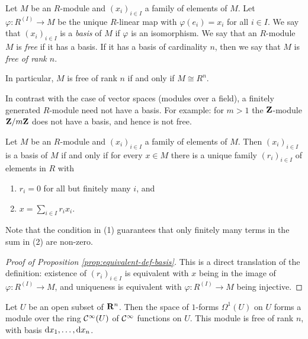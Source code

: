 \begin{definition}
Let $M$ be an $R$-module and $(x_i)_{i \in I}$ a family of elements of $M$. Let $\varphi\colon R^{(I)} \to M$ be the unique $R$-linear map with
$\varphi(e_i)=x_i$ for all $i\in I$. We say that $(x_i)_{i\in I}$ is a \emph{basis} of $M$ if $\varphi$ is an isomorphism. We say that an $R$-module $M$ is \emph{free} if it has a basis. If it has a basis of cardinality $n$, then we say that $M$ is \emph{free of rank $n$}.
\end{definition}

In particular, $M$ is free of rank $n$ if and only if $M\cong R^n$.


In contrast with the case of vector spaces (modules over a field), a finitely generated $R$-module need not have a basis. For example: for $m> 1$ the ${\mathbf{Z}}$-module ${\mathbf{Z}}/m{\mathbf{Z}}$ does not have a basis, and hence is not free.

\begin{proposition}\label{prop:equivalent-def-basis}
Let $M$ be an $R$-module and $(x_i)_{i \in I}$ a family of elements of $M$. Then $(x_i)_{i\in I}$ is a basis of $M$ if and only if for every $x\in M$ there 
is a unique family $(r_i)_{i\in I}$ of elements in $R$ with
\begin{enumerate}
\item $r_i=0$ for all but finitely many $i$, and
\item   $x=\sum_{i\in I} r_i x_i$.
\end{enumerate}
\end{proposition}

Note that  the condition in (1) guarantees that only finitely many terms in the sum in (2) are non-zero.

\begin{proof}[Proof of Proposition \ref{prop:equivalent-def-basis}]
This is a direct translation of the definition: existence of $(r_i)_{i\in I}$ is equivalent with $x$ being in the image of $\varphi\colon R^{(I)}\to M$, and uniqueness is equivalent with $\varphi\colon R^{(I)} \to M$ being injective.
\end{proof}

\begin{example}
Let $U$ be an open subset of ${\mathbf{R}}^n$. Then the space of $1$-forms $\Omega^1(U)$ on $U$ forms a module over the ring ${\mathcal{C}}^\infty(U)$ of ${\mathcal{C}}^\infty$ functions on $U$. This module is free of rank $n$, with basis ${\rm d} x_1, \ldots, {\rm d}x_n$.
\end{example}


